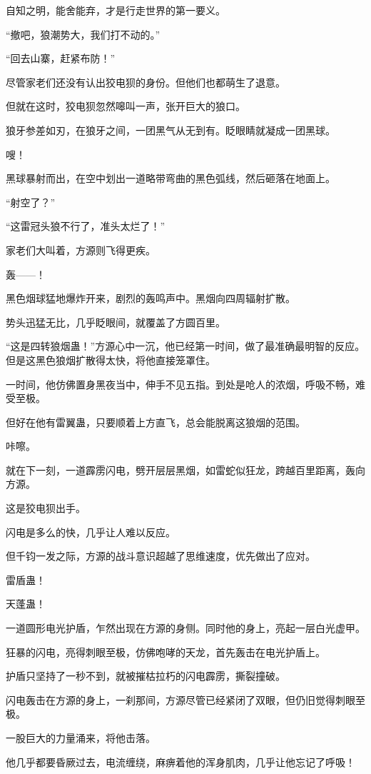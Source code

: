 \begin{this_body}
自知之明，能舍能弃，才是行走世界的第一要义。

“撤吧，狼潮势大，我们打不动的。”

“回去山寨，赶紧布防！”

尽管家老们还没有认出狡电狈的身份。但他们也都萌生了退意。

但就在这时，狡电狈忽然嗥叫一声，张开巨大的狼口。

狼牙参差如刃，在狼牙之间，一团黑气从无到有。眨眼睛就凝成一团黑球。

嗖！

黑球暴射而出，在空中划出一道略带弯曲的黑色弧线，然后砸落在地面上。

“射空了？”

“这雷冠头狼不行了，准头太烂了！”

家老们大叫着，方源则飞得更疾。

轰——！

黑色烟球猛地爆炸开来，剧烈的轰鸣声中。黑烟向四周辐射扩散。

势头迅猛无比，几乎眨眼间，就覆盖了方圆百里。

“这是四转狼烟蛊！”方源心中一沉，他已经第一时间，做了最准确最明智的反应。但是这黑色狼烟扩散得太快，将他直接笼罩住。

一时间，他仿佛置身黑夜当中，伸手不见五指。到处是呛人的浓烟，呼吸不畅，难受至极。

但好在他有雷翼蛊，只要顺着上方直飞，总会能脱离这狼烟的范围。

咔嚓。

就在下一刻，一道霹雳闪电，劈开层层黑烟，如雷蛇似狂龙，跨越百里距离，轰向方源。

这是狡电狈出手。

闪电是多么的快，几乎让人难以反应。

但千钧一发之际，方源的战斗意识超越了思维速度，优先做出了应对。

雷盾蛊！

天蓬蛊！

一道圆形电光护盾，乍然出现在方源的身侧。同时他的身上，亮起一层白光虚甲。

狂暴的闪电，亮得刺眼至极，仿佛咆哮的天龙，首先轰击在电光护盾上。

护盾只坚持了一秒不到，就被摧枯拉朽的闪电霹雳，撕裂撞破。

闪电轰击在方源的身上，一刹那间，方源尽管已经紧闭了双眼，但仍旧觉得刺眼至极。

一股巨大的力量涌来，将他击落。

他几乎都要昏厥过去，电流缠绕，麻痹着他的浑身肌肉，几乎让他忘记了呼吸！


\end{this_body}
